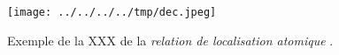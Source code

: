 

\begin{figure}
  \centering
  \texttt{[image: ../../../../tmp/dec.jpeg]}
  \caption{Exemple de la XXX de la \emph{relation de localisation
      atomique} \protect{}.}
  \label{fig:methode_selecteur}
\end{figure}

